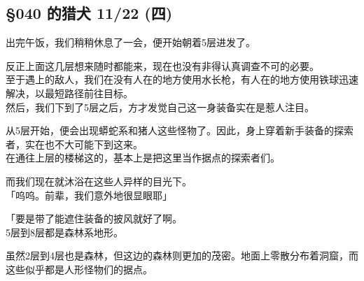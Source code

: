 \subsection{§040 的猎犬 11/22 (四)}

出完午饭，我们稍稍休息了一会，便开始朝着5层进发了。

反正上面这几层想来随时都能来，现在也没有非得认真调查不可的必要。\\

至于遇上的敌人，我们在没有人在的地方使用水长枪，有人在的地方使用铁球迅速解决，以最短路径前往目标。\\

然后，我们下到了5层之后，方才发觉自己这一身装备实在是惹人注目。

从5层开始，便会出现蟒蛇系和猪人这些怪物了。因此，身上穿着新手装备的探索者，实在也不大可能下到这来。\\

在通往上层的楼梯这的，基本上是把这里当作据点的探索者们。

而我们现在就沐浴在这些人异样的目光下。\\

「呜呜。前辈，我们意外地很显眼耶」

「要是带了能遮住装备的披风就好了啊。\\

5层到8层都是森林系地形。

虽然2层到4层也是森林，但这边的森林则更加的茂密。地面上零散分布着洞窟，而这些似乎都是人形怪物们的据点。\\

